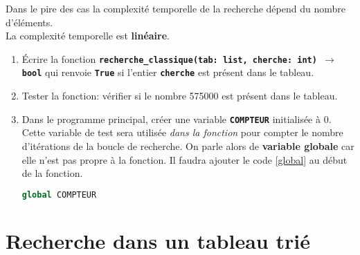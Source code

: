 \documentclass[a4paper,11pt]{article}
\begin{document}
\begin{aretenir}[]
Dans le pire des cas la complexité temporelle de la recherche dépend du nombre d'éléments.
\\
\centering La complexité temporelle est \textbf{linéaire}.
\end{aretenir}
\begin{activite}
    \begin{enumerate}
        \item Écrire la fonction \textbf{\texttt{recherche\_classique(tab: list, cherche: int) $\rightarrow$ bool}} qui renvoie \textbf{\texttt{True}} si l'entier \textbf{\texttt{cherche}} est présent dans le tableau.
        \item Tester la fonction: vérifier si le nombre 575000 est présent dans le tableau.
        \item Dans le programme principal, créer une variable \textbf{\texttt{COMPTEUR}} initialisée à 0. Cette variable de test sera utilisée \emph{dans la fonction} pour compter le nombre d'itérations de la boucle de recherche. On parle alors de \textbf{variable globale} car elle n'est pas propre à la fonction. Il faudra ajouter le code \ref{global} au début de la fonction.
        \begin{center}
        \begin{lstlisting}[language=Python  , xleftmargin=2em, xrightmargin=2em]
global COMPTEUR
\end{lstlisting}
        \label{global}
        \end{center}
    \end{enumerate}
\end{activite}
\section{Recherche dans un tableau trié}
\end{document}
